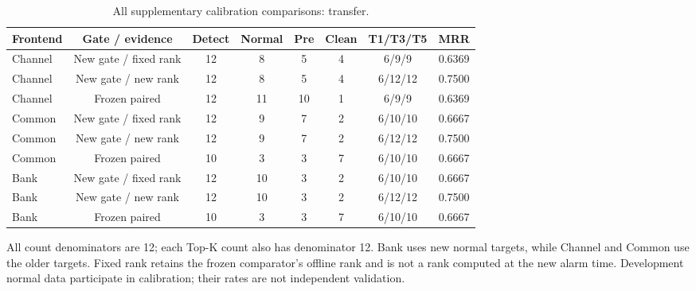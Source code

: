 \begin{table}[htbp]
\centering\footnotesize
\caption{All supplementary calibration comparisons: transfer.}
\label{tab:s_transfer}
\renewcommand{\arraystretch}{1.15}
\setlength{\tabcolsep}{4pt}
\begin{tabular}{lccccccc}
\toprule
Frontend & Gate / evidence & Detect & Normal & Pre & Clean & T1/T3/T5 & MRR\\
\midrule
Channel & New gate / fixed rank & 12 & 8 & 5 & 4 & 6/9/9 & 0.6369\\
Channel & New gate / new rank & 12 & 8 & 5 & 4 & 6/12/12 & 0.7500\\
Channel & Frozen paired & 12 & 11 & 10 & 1 & 6/9/9 & 0.6369\\
Common & New gate / fixed rank & 12 & 9 & 7 & 2 & 6/10/10 & 0.6667\\
Common & New gate / new rank & 12 & 9 & 7 & 2 & 6/12/12 & 0.7500\\
Common & Frozen paired & 10 & 3 & 3 & 7 & 6/10/10 & 0.6667\\
Bank & New gate / fixed rank & 12 & 10 & 3 & 2 & 6/10/10 & 0.6667\\
Bank & New gate / new rank & 12 & 10 & 3 & 2 & 6/12/12 & 0.7500\\
Bank & Frozen paired & 10 & 3 & 3 & 7 & 6/10/10 & 0.6667\\
\bottomrule
\end{tabular}
\par\smallskip\parbox{0.98\linewidth}{\scriptsize All count denominators are 12; each Top-K count also has denominator 12. Bank uses new normal targets, while Channel and Common use the older targets. Fixed rank retains the frozen comparator's offline rank and is not a rank computed at the new alarm time. Development normal data participate in calibration; their rates are not independent validation.}
\end{table}
